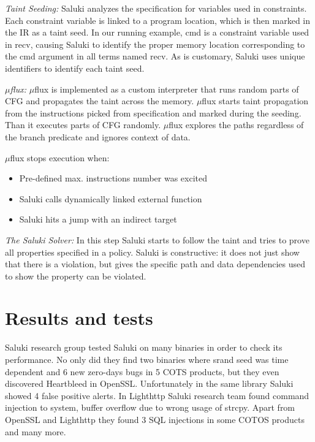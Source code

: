 \documentclass[a4paper, 12pt, journal, onecolumn]{IEEEtran}
\begin{document}
\textit{Taint Seeding:} Saluki analyzes the specification for variables used in constraints. Each constraint variable is linked to
a program location, which is then marked in the IR as a taint
seed. In our running example, cmd is a constraint variable used
in recv, causing Saluki to identify the proper memory location
corresponding to the cmd argument in all terms named recv.
As is customary, Saluki uses unique identifiers to identify each
taint seed.\cite{saluki}
\bigskip

\textit{$\mu$flux:} $\mu$flux is implemented as a custom interpreter that runs random parts of CFG and propagates the taint across the memory. $\mu$flux starts taint propagation from the instructions picked from specification and marked during the seeding. Than it executes parts of CFG randomly. $\mu$flux explores the paths regardless of the branch predicate and ignores context of data.
\medskip

$\mu$flux stops execution when:
\begin{itemize}
\item Pre-defined max. instructions number was excited
\item Saluki calls dynamically linked external function
\item Saluki hits a jump with an indirect target
\end{itemize}

\bigskip
\textit{The Saluki Solver:} In this step Saluki starts to follow the taint and tries to prove all properties specified in a policy. Saluki is constructive: it does not just show that there is a violation, but gives the specific path and data dependencies used to show the property can be violated.



\section{Results and tests}

Saluki research group tested Saluki on many binaries in order to check its performance. No only did they find two binaries where srand seed was time dependent and 6 new zero-days bugs in 5 COTS products, but they even discovered Heartbleed in OpenSSL. Unfortunately in the same library Saluki showed 4 false positive alerts.
In Lighthttp Saluki research team found command injection to system, buffer overflow due to wrong usage of strcpy. Apart from OpenSSL and Lighthttp they found 3 SQL injections in some COTOS products and many more.
\end{document}

